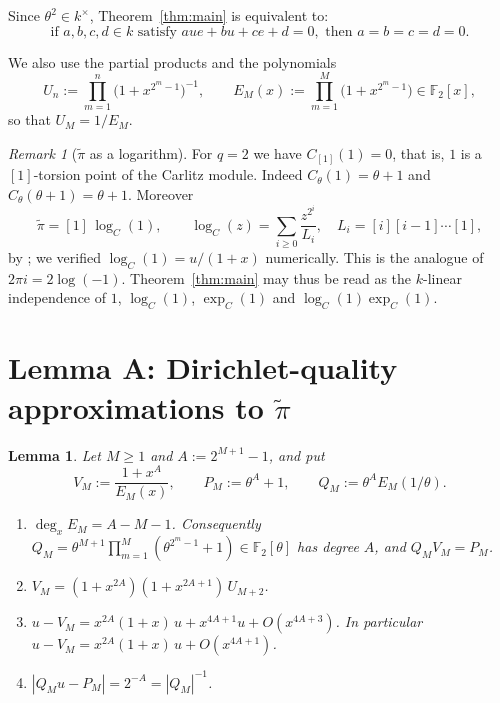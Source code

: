 \documentclass[11pt]{amsart}
\newtheorem{lemma}[theorem]{Lemma}
\theoremstyle{remark}
\newtheorem{remark}[theorem]{Remark}
\numberwithin{equation}{section}
\newcommand{\F}{\mathbb{F}}
\newcommand{\pit}{\tilde\pi}
\begin{document}
Since $\theta^2\in k^\times$, Theorem~\ref{thm:main} is equivalent to:
\begin{equation}\label{eq:restate}
\text{if } a,b,c,d\in k \text{ satisfy } aue+bu+ce+d=0, \text{ then } a=b=c=d=0 .
\end{equation}

We also use the partial products and the polynomials
\[
U_n:=\prod_{m=1}^{n}\bigl(1+x^{2^m-1}\bigr)^{-1},\qquad E_M(x):=\prod_{m=1}^{M}\bigl(1+x^{2^m-1}\bigr)\in\F_2[x],
\]
so that $U_M=1/E_M$.

\begin{remark}[$\pit$ as a logarithm]\label{rem:log}
For $q=2$ we have $C_{[1]}(1)=0$, that is, $1$ is a $[1]$-torsion point of the Carlitz module. Indeed $C_\theta(1)=\theta+1$ and $C_\theta(\theta+1)=\theta+1$. Moreover
\[
\pit=[1]\,\log_C(1),\qquad \log_C(z)=\sum_{i\ge0}\frac{z^{2^i}}{L_i},\quad L_i=[i][i-1]\cdots[1],
\]
by \cite[Remark~(3)]{Tha92}; we verified $\log_C(1)=u/(1+x)$ numerically. This is the analogue of $2\pi i=2\log(-1)$. Theorem~\ref{thm:main} may thus be read as the $k$-linear independence of $1$, $\log_C(1)$, $\exp_C(1)$ and $\log_C(1)\exp_C(1)$.
\end{remark}

\section{Lemma A: Dirichlet-quality approximations to \texorpdfstring{$\pit$}{the period}}\label{sec:A}

\begin{lemma}\label{lem:A}
Let $M\ge1$ and $A:=2^{M+1}-1$, and put
\[
V_M:=\frac{1+x^A}{E_M(x)},\qquad P_M:=\theta^A+1,\qquad Q_M:=\theta^A E_M(1/\theta).
\]
\begin{enumerate}
\item[(1)] $\deg_xE_M=A-M-1$. Consequently $Q_M=\theta^{M+1}\prod_{m=1}^{M}(\theta^{2^m-1}+1)\in\F_2[\theta]$ has degree $A$, and $Q_MV_M=P_M$.
\item[(2)] $V_M=(1+x^{2A})(1+x^{2A+1})\,U_{M+2}$.
\item[(3)] $u-V_M=x^{2A}(1+x)\,u+x^{4A+1}u+O(x^{4A+3})$. In particular $u-V_M=x^{2A}(1+x)\,u+O(x^{4A+1})$.
\item[(4)] $|Q_Mu-P_M|=2^{-A}=|Q_M|^{-1}$.
\end{enumerate}
\end{lemma}
\end{document}

